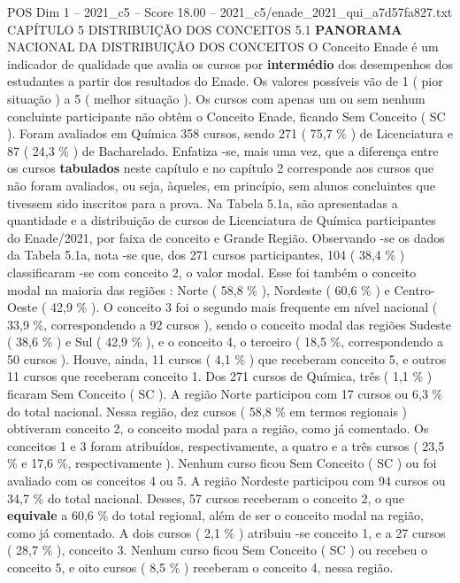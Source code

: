\begin{textsample}{POS Dim 1 – 2021\_c5 – Score 18.00 – 2021\_c5/enade\_2021\_qui\_a7d57fa827.txt}  \label{ex:f1_pos_033}
CAPÍTULO 5 DISTRIBUIÇÃO DOS CONCEITOS 5.1 \textbf{PANORAMA} NACIONAL DA DISTRIBUIÇÃO DOS CONCEITOS O Conceito Enade é um indicador de qualidade que avalia os cursos por \textbf{intermédio} dos desempenhos dos estudantes a partir dos resultados do Enade.
Os valores possíveis vão de 1 ( pior situação ) a 5 ( melhor situação ).
Os cursos com apenas um ou sem nenhum concluinte participante não obtêm o Conceito Enade, ficando Sem Conceito ( SC ).
Foram avaliados em Química 358 cursos, sendo 271 ( 75,7 \% ) de Licenciatura e 87 ( 24,3 \% ) de Bacharelado.
Enfatiza -se, mais uma vez, que a diferença entre os cursos \textbf{tabulados} neste capítulo e no capítulo 2 corresponde aos cursos que não foram avaliados, ou seja, àqueles, em princípio, sem alunos concluintes que tivessem sido inscritos para a prova.
Na Tabela 5.1a, são apresentadas a quantidade e a distribuição de cursos de Licenciatura de Química participantes do Enade/2021, por faixa de conceito e Grande Região.
Observando -se os dados da Tabela 5.1a, nota -se que, dos 271 cursos participantes, 104 ( 38,4 \% ) classificaram -se com conceito 2, o valor modal.
Esse foi também o conceito modal na maioria das regiões : Norte ( 58,8 \% ), Nordeste ( 60,6 \% ) e Centro-Oeste ( 42,9 \% ).
O conceito 3 foi o segundo mais frequente em nível nacional ( 33,9 \%, correspondendo a 92 cursos ), sendo o conceito modal das regiões Sudeste ( 38,6 \% ) e Sul ( 42,9 \% ), e o conceito 4, o terceiro ( 18,5 \%, correspondendo a 50 cursos ).
Houve, ainda, 11 cursos ( 4,1 \% ) que receberam conceito 5, e outros 11 cursos que receberam conceito 1.
Dos 271 cursos de Química, três ( 1,1 \% ) ficaram Sem Conceito ( SC ).
A região Norte participou com 17 cursos ou 6,3 \% do total nacional.
Nessa região, dez cursos ( 58,8 \% em termos regionais ) obtiveram conceito 2, o conceito modal para a região, como já comentado.
Os conceitos 1 e 3 foram atribuídos, respectivamente, a quatro e a três cursos ( 23,5 \% e 17,6 \%, respectivamente ).
Nenhum curso ficou Sem Conceito ( SC ) ou foi avaliado com os conceitos 4 ou 5.
A região Nordeste participou com 94 cursos ou 34,7 \% do total nacional.
Desses, 57 cursos receberam o conceito 2, o que \textbf{equivale} a 60,6 \% do total regional, além de ser o conceito modal na região, como já comentado.
A dois cursos ( 2,1 \% ) atribuiu -se conceito 1, e a 27 cursos ( 28,7 \% ), conceito 3.
Nenhum curso ficou Sem Conceito ( SC ) ou recebeu o conceito 5, e oito cursos ( 8,5 \% ) receberam o conceito 4, nessa região.

\end{textsample}
